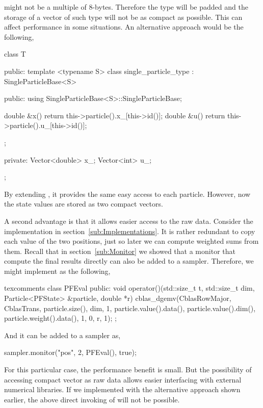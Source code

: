 might not be a multiple of 8-bytes. Therefore the type will be padded and the
storage of a vector of such type will not be as compact as possible. This can
affect performance in some situations. An alternative approach would be the
following,
\begin{cppcode}
  class T
  {
      public:
      template <typename S>
      class single_particle_type : SingleParticleBase<S>
      {
          public:
          using SingleParticleBase<S>::SingleParticleBase;

          double &x() { return this->particle().x_[this->id()]; }
          double &u() { return this->particle().u_[this->id()]; }
      };

      private:
      Vector<double> x_;
      Vector<int> u_;
  };
\end{cppcode}
By extending , it provides the same easy access to
each particle. However, now the state values are stored as two compact vectors.

A second advantage is that it allows easier access to the raw data. Consider
the implementation  in section~\ref{sub:Implementations}.
It is rather redundant to copy each value of the two positions, just so later
we can compute weighted sums from them. Recall that in
section~\ref{sub:Monitor} we showed that a monitor that compute the final
results directly can also be added to a sampler. Therefore, we might
implement  as the following,
\begin{cppcode*}{texcomments}
  class PFEval
  {
      public:
      void operator()(std::size_t t, std::size_t dim,
          Particle<PFState> &particle, double *r)
      {
          cblas_dgemv(CblasRowMajor, CblasTrans, particle.size(), dim, 1,
              particle.value().data(), particle.value().dim(),
              particle.weight().data(), 1, 0, r, 1);
      }
  };
\end{cppcode*}
And it can be added to a sampler as,
\begin{cppcode}
  sampler.monitor("pos", 2, PFEval(), true);
\end{cppcode}
For this particular case, the performance benefit is small. But the possibility
of accessing compact vector as raw data allows easier interfacing with external
numerical libraries. If we implemented  with the alternative
approach shown earlier, the above direct invoking of 
will not be possible.
